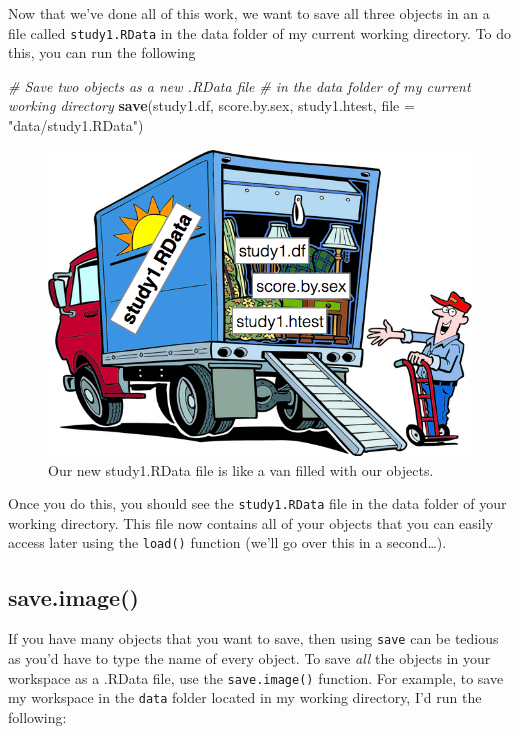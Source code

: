 \documentclass[]{book}
\newenvironment{Shaded}{\begin{snugshade}}{\end{snugshade}}
\newcommand{\KeywordTok}[1]{\textcolor[rgb]{0.13,0.29,0.53}{\textbf{{#1}}}}
\newcommand{\DataTypeTok}[1]{\textcolor[rgb]{0.13,0.29,0.53}{{#1}}}
\newcommand{\StringTok}[1]{\textcolor[rgb]{0.31,0.60,0.02}{{#1}}}
\newcommand{\CommentTok}[1]{\textcolor[rgb]{0.56,0.35,0.01}{\textit{{#1}}}}
\newcommand{\NormalTok}[1]{{#1}}
\theoremstyle{definition}
\theoremstyle{definition}
\theoremstyle{remark}
\begin{document}
Now that we've done all of this work, we want to save all three objects
in an a file called \texttt{study1.RData} in the data folder of my
current working directory. To do this, you can run the following

\begin{Shaded}
\begin{Highlighting}[]
\CommentTok{# Save two objects as a new .RData file}
\CommentTok{#   in the data folder of my current working directory}
\KeywordTok{save}\NormalTok{(study1.df, score.by.sex, study1.htest,}
     \DataTypeTok{file =} \StringTok{"data/study1.RData"}\NormalTok{)}
\end{Highlighting}
\end{Shaded}

\begin{figure}

{\centering \includegraphics[width=0.75\linewidth]{images/rdatavan} 

}

\caption{Our new study1.RData file is like a van filled with our objects.}\label{fig:rdatavan}
\end{figure}

Once you do this, you should see the \texttt{study1.RData} file in the
data folder of your working directory. This file now contains all of
your objects that you can easily access later using the \texttt{load()}
function (we'll go over this in a second\ldots{}).

\subsection{save.image()}\label{save.image}

If you have many objects that you want to save, then using \texttt{save}
can be tedious as you'd have to type the name of every object. To save
\emph{all} the objects in your workspace as a .RData file, use the
\texttt{save.image()} function. For example, to save my workspace in the
\texttt{data} folder located in my working directory, I'd run the
following:
\end{document}
